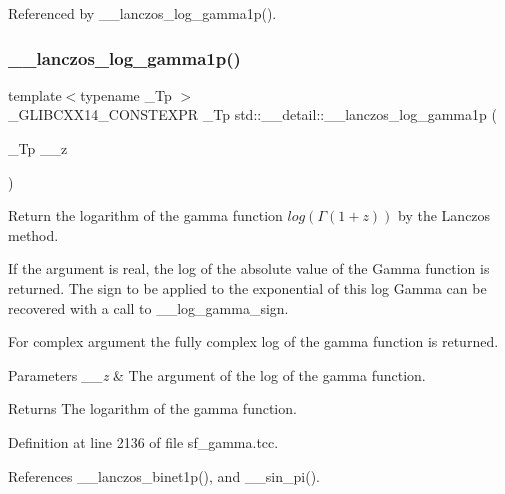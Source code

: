 Referenced by \+\_\+\+\_\+lanczos\+\_\+log\+\_\+gamma1p().

\mbox{\label{namespacestd_1_1____detail_a4586aeea80ba556ab8d6393dadb05c5c}} 
\subsubsection{\texorpdfstring{\+\_\+\+\_\+lanczos\+\_\+log\+\_\+gamma1p()}{\_\_lanczos\_log\_gamma1p()}}
{\footnotesize\ttfamily template$<$typename \+\_\+\+Tp $>$ \\
\+\_\+\+G\+L\+I\+B\+C\+X\+X14\+\_\+\+C\+O\+N\+S\+T\+E\+X\+PR \+\_\+\+Tp std\+::\+\_\+\+\_\+detail\+::\+\_\+\+\_\+lanczos\+\_\+log\+\_\+gamma1p (\begin{DoxyParamCaption}\item[{\+\_\+\+Tp}]{\+\_\+\+\_\+z }\end{DoxyParamCaption})}



Return the logarithm of the gamma function $ log(\Gamma(1+z)) $ by the Lanczos method. 

If the argument is real, the log of the absolute value of the Gamma function is returned. The sign to be applied to the exponential of this log Gamma can be recovered with a call to \+\_\+\+\_\+log\+\_\+gamma\+\_\+sign.

For complex argument the fully complex log of the gamma function is returned.


\begin{DoxyParams}{Parameters}
{\em \+\_\+\+\_\+z} & The argument of the log of the gamma function. \\
\hline
\end{DoxyParams}
\begin{DoxyReturn}{Returns}
The logarithm of the gamma function. 
\end{DoxyReturn}


Definition at line 2136 of file sf\+\_\+gamma.\+tcc.



References \+\_\+\+\_\+lanczos\+\_\+binet1p(), and \+\_\+\+\_\+sin\+\_\+pi().

\mbox{\label{namespacestd_1_1____detail_ab06b50bbac9758b5a2cc7d3d8213daa9}} 
